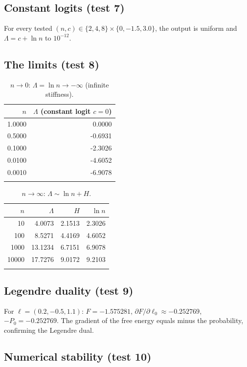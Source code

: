 \documentclass[11pt]{article}
\begin{document}
\subsection{Constant logits (test 7)}
\label{sec:ev-const}

For every tested $(n,c)\in\{2,4,8\}\times\{0,-1.5,3.0\}$, the output is
uniform and $\Lambda = c + \ln n$ to $10^{-12}$.

\subsection{The limits (test 8)}
\label{sec:ev-limits}

\begin{longtable}{@{}rr@{}}
\toprule
$n$ & $\Lambda$ (constant logit $c=0$) \\
\midrule
1.0000 & 0.0000 \\
0.5000 & -0.6931 \\
0.1000 & -2.3026 \\
0.0100 & -4.6052 \\
0.0010 & -6.9078 \\
\bottomrule
\caption{$n\to 0$: $\Lambda=\ln n\to -\infty$ (infinite stiffness).}
\label{tab:ev-lim0}
\end{longtable}

\begin{longtable}{@{}rrrr@{}}
\toprule
$n$ & $\Lambda$ & $H$ & $\ln n$ \\
\midrule
10 & 4.0073 & 2.1513 & 2.3026 \\
100 & 8.5271 & 4.4169 & 4.6052 \\
1000 & 13.1234 & 6.7151 & 6.9078 \\
10000 & 17.7276 & 9.0172 & 9.2103 \\
\bottomrule
\caption{$n\to\infty$: $\Lambda \sim \ln n + H$.}
\label{tab:ev-liminf}
\end{longtable}

\subsection{Legendre duality (test 9)}
\label{sec:ev-legendre}

For $\ell=(0.2,-0.5,1.1)$: $F=-1.575281$,
$\partial F/\partial \ell_0 \approx -0.252769$, $-P_0 = -0.252769$.
The gradient of the free energy equals minus the probability, confirming the
Legendre dual.

\subsection{Numerical stability (test 10)}
\label{sec:ev-lse}
\end{document}
